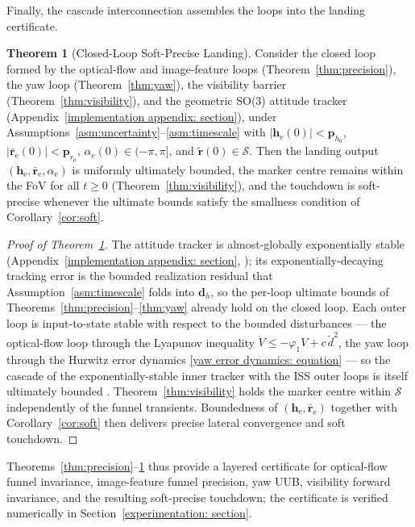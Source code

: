 \documentclass{IEEEtaes}
\theoremstyle{definition}
\newtheorem{theorem}{Theorem}
\theoremstyle{remark}
\begin{document}
Finally, the cascade interconnection assembles the loops into the landing certificate.

\begin{theorem}[Closed-Loop Soft-Precise Landing]\label{thm:cascade} Consider the closed loop formed by the optical-flow and image-feature loops (Theorem~\ref{thm:precision}), the yaw loop (Theorem~\ref{thm:yaw}), the visibility barrier (Theorem~\ref{thm:visibility}), and the geometric SO(3) attitude tracker (Appendix~\ref{implementation appendix: section}), under Assumptions~\ref{asm:uncertainty}--\ref{asm:timescale} with $|\boldsymbol{h}_\text{e}(0)|<\boldsymbol{p}_{h_0}$, $|\bar{\boldsymbol{r}}_\text{e}(0)|<\boldsymbol{p}_{r_0}$, $\alpha_\text{e}(0)\in(-\pi,\pi]$, and $\tilde{\boldsymbol{r}}(0)\in\mathcal{S}$. Then the landing output $(\boldsymbol{h}_\text{e},\bar{\boldsymbol{r}}_\text{e},\alpha_\text{e})$ is uniformly ultimately bounded, the marker centre remains within the FoV for all $t\ge 0$ (Theorem~\ref{thm:visibility}), and the touchdown is soft-precise whenever the ultimate bounds satisfy the smallness condition of Corollary~\ref{cor:soft}.
\end{theorem}

\begin{proof}[Proof of Theorem~\ref{thm:cascade}] The attitude tracker is almost-globally exponentially stable (Appendix~\ref{implementation appendix: section}, \cite[Prop.~1]{lee2010}); its exponentially-decaying tracking error is the bounded realization residual that Assumption~\ref{asm:timescale} folds into $\boldsymbol{d}_h$, so the per-loop ultimate bounds of Theorems~\ref{thm:precision}--\ref{thm:yaw} already hold on the closed loop. Each outer loop is input-to-state stable with respect to the bounded disturbances --- the optical-flow loop through the Lyapunov inequality $\dot{V}\le-\varphi_1 V+c\,\tilde{d}^2$, the yaw loop through the Hurwitz error dynamics \eqref{yaw error dynamics: equation} --- so the cascade of the exponentially-stable inner tracker with the ISS outer loops is itself ultimately bounded \cite{khalil2002}. Theorem~\ref{thm:visibility} holds the marker centre within $\mathcal{S}$ independently of the funnel transients. Boundedness of $(\boldsymbol{h}_\text{e},\bar{\boldsymbol{r}}_\text{e})$ together with Corollary~\ref{cor:soft} then delivers precise lateral convergence and soft touchdown. \end{proof}

Theorems~\ref{thm:precision}--\ref{thm:cascade} thus provide a layered certificate for optical-flow funnel invariance, image-feature funnel precision, yaw UUB, visibility forward invariance, and the resulting soft-precise touchdown; the certificate is verified numerically in Section~\ref{experimentation: section}.
\end{document}
